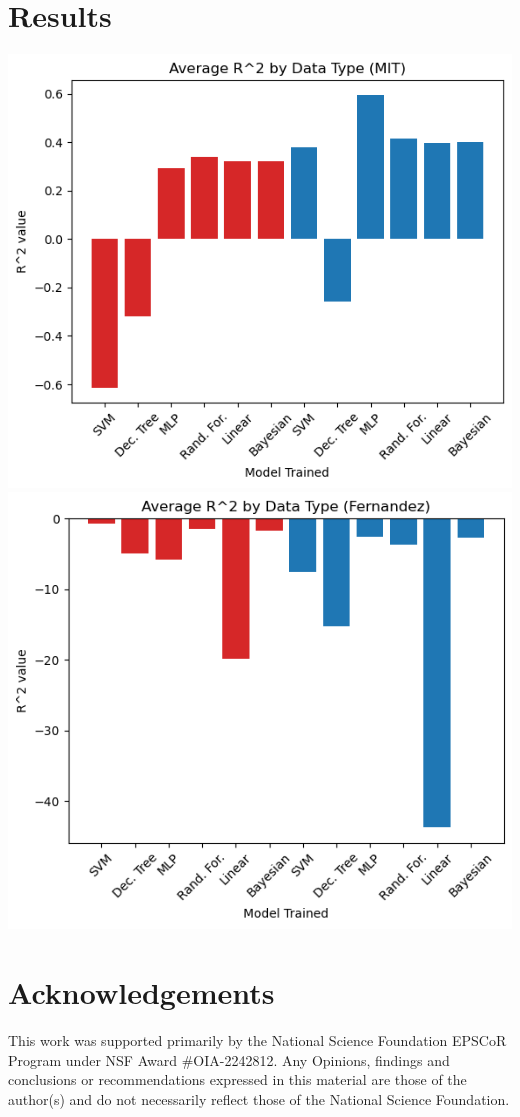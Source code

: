 \documentclass{betterposter}
\begin{document}
{        \section{Results}
        \includegraphics{assets/Average-R^2-by-Data-Type-MIT.png}
        \includegraphics{assets/Average-R^2-by-Data-Type-Fernandez.png}

        \section{Acknowledgements}
        
        This work was supported primarily by the National Science Foundation
        EPSCoR Program under NSF Award \#OIA-2242812. Any Opinions, findings
        and conclusions or recommendations expressed in this material are
        those of the author(s) and do not necessarily reflect those of the
        National Science Foundation.


    }
\end{document}
